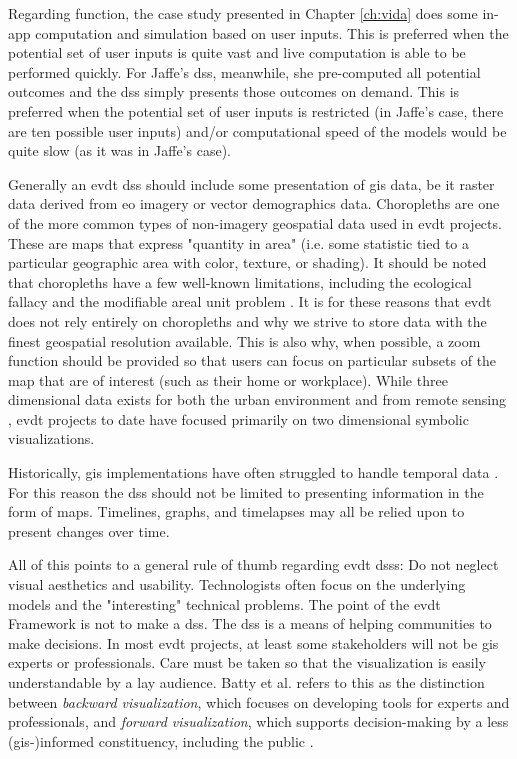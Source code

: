 Regarding function, the case study presented in Chapter \ref{ch:vida} does some in-app computation and simulation based on user inputs. This is preferred when the potential set of user inputs is quite vast and live computation is able to be performed quickly. For Jaffe's \ac{dss}, meanwhile, she pre-computed all potential outcomes and the \ac{dss} simply presents those outcomes on demand. This is preferred when the potential set of user inputs is restricted (in Jaffe's case, there are ten possible user inputs) and/or computational speed of the models would be quite slow (as it was in Jaffe's case). 

Generally an \ac{evdt} \ac{dss} should include some presentation of \ac{gis} data, be it raster data derived from \ac{eo} imagery or vector demographics data. Choropleths are one of the more common types of non-imagery geospatial data used in \ac{evdt} projects. These are maps that express "quantity in area" (i.e. some statistic tied to a particular geographic area with color, texture, or shading). It should be noted that choropleths have a few well-known limitations, including the ecological fallacy and the modifiable areal unit problem \cite{cramptonRethinkingMapsIdentity2011, sawickiNeighborhoodIndicatorsReview1996}. It is for these reasons that \ac{evdt} does not rely entirely on choropleths and why we strive to store data with the finest geospatial resolution available. This is also why, when possible, a zoom function should be provided so that users can focus on particular subsets of the map that are of interest (such as their home or workplace). While three dimensional data exists for both the urban environment \cite{battyVisualizingCityCommunication2000} and from remote sensing \cite{sunAerial3DBuilding2013}, \ac{evdt} projects to date have focused primarily on two dimensional symbolic visualizations.

Historically, \ac{gis} implementations have often struggled to handle temporal data \cite{harrisLocationalModelsGeographic1993}. For this reason the \ac{dss} should not be limited to presenting information in the form of maps. Timelines, graphs, and timelapses may all be relied upon to present changes over time.

All of this points to a general rule of thumb regarding \ac{evdt} \acp{dss}: Do not neglect visual aesthetics and usability. Technologists often focus on the underlying models and the "interesting" technical problems. The point of the \ac{evdt} Framework is not to make a \ac{dss}. The \ac{dss} is a means of helping communities to make decisions. In most \ac{evdt} projects, at least some stakeholders will not be \ac{gis} experts or professionals. Care must be taken so that the visualization is easily understandable by a lay audience. Batty et al. refers to this as the distinction between \textit{backward visualization}, which focuses on developing tools for experts and professionals, and \textit{forward visualization}, which supports decision-making by a less (\ac{gis}-)informed constituency, including the public \cite{battyVisualizingCityCommunication2000}.

